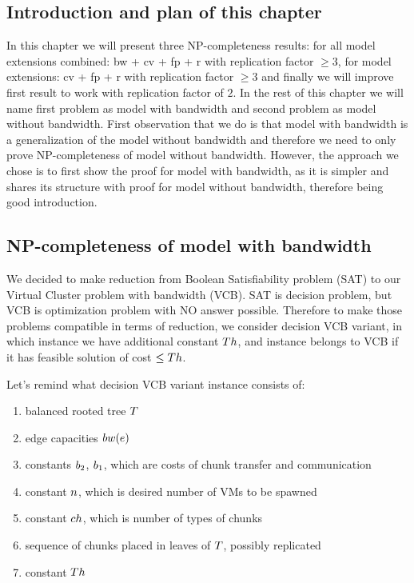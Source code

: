 \subsection{Introduction and plan of this chapter}

In this chapter we will present three NP-completeness results: for all
model extensions combined: bw + cv + fp + r with replication factor
$\geq 3$, for model extensions: cv + fp + r with replication factor
$\geq 3$ and finally we will improve first result to work with
replication factor of $2$. In the rest of this chapter we will name
first problem as model with bandwidth and second problem as model
without bandwidth. First observation that we do is that model with
bandwidth is a generalization of the model without bandwidth and
therefore we need to only prove NP-completeness of model without
bandwidth. However, the approach we chose is to first show the proof
for model with bandwidth, as it is simpler and shares its structure
with proof for model without bandwidth, therefore being good
introduction.

\subsection{NP-completeness of model with bandwidth}

We decided to make reduction from Boolean Satisfiability problem (SAT)
to our Virtual Cluster problem with bandwidth (VCB). SAT is decision
problem, but VCB is optimization problem with NO answer
possible. Therefore to make those problems compatible in terms of
reduction, we consider decision VCB variant, in which instance we have
additional constant $Th$, and instance belongs to VCB if it has feasible
solution of cost $\leq Th$.

Let's remind what decision VCB variant instance consists of:
\begin{enumerate}
\item balanced rooted tree $T$ 
\item edge capacities $bw(e)$
\item constants $b_2$, $b_1$, which are costs of chunk transfer and
communication
\item constant $n$, which is desired number of VMs to be spawned
\item constant $ch$, which is number of types of chunks
\item sequence of chunks placed in leaves of $T$, possibly replicated
\item constant $Th$
\end{enumerate}

